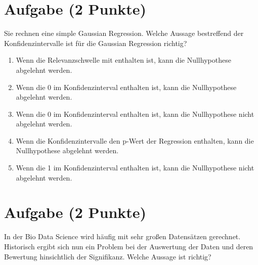 \documentclass[a4paper, 10pt]{scrartcl}\usepackage[]{graphicx}\usepackage[]{xcolor}
\begin{document}
\section{Aufgabe \hfill (2 Punkte)}



Sie rechnen eine simple Gaussian Regression. Welche Aussage bestreffend der
Konfidenzintervalle ist f{\"u}r die Gaussian Regression richtig?



\begin{enumerate}
\item [\textbf{A} \msquare] Wenn die Relevanzschwelle mit enthalten ist, kann die Nullhypothese abgelehnt werden.
\item [\textbf{B} \msquare] Wenn die 0 im Konfidenzinterval enthalten ist, kann die Nullhypothese abgelehnt werden.
\item [\textbf{C} \msquare] Wenn die 0 im Konfidenzinterval enthalten ist, kann die Nullhypothese nicht abgelehnt werden.
\item [\textbf{D} \msquare] Wenn die Konfidenzintervalle den p-Wert der Regression enthalten, kann die Nullhypothese abgelehnt werden.
\item [\textbf{E} \msquare] Wenn die 1 im Konfidenzinterval enthalten ist, kann die Nullhypothese nicht abgelehnt werden.
\end{enumerate}

\section{Aufgabe \hfill (2 Punkte)}

In der Bio Data Science wird h{\"a}ufig mit sehr gro{\ss}en Datens{\"a}tzen
gerechnet. Historisch ergibt sich nun ein Problem bei der Auswertung der
Daten und deren Bewertung hinsichtlich der Signifikanz. Welche Aussage ist richtig?
\end{document}
